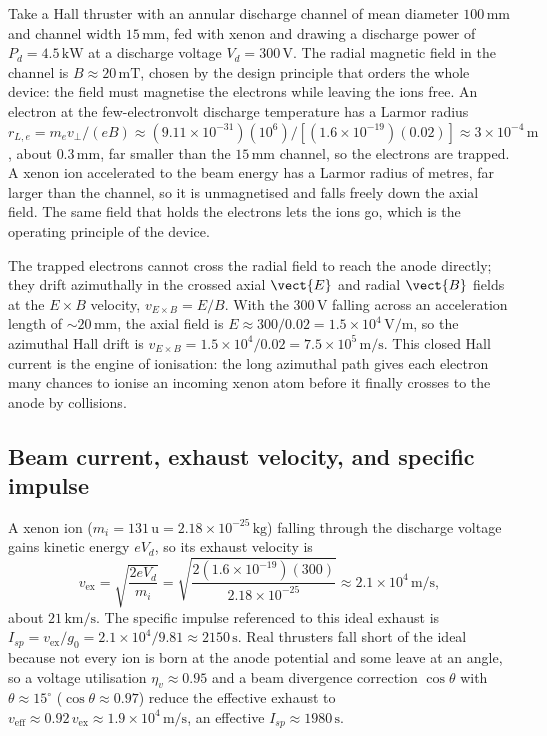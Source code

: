 Take a Hall thruster with an annular discharge channel of mean diameter
$100\,\si{\milli\meter}$ and channel width $15\,\si{\milli\meter}$, fed with
xenon and drawing a discharge power of $P_{d} = 4.5\,\si{\kilo\watt}$ at a
discharge voltage $V_{d} = 300\,\si{\volt}$. The radial magnetic field in
the channel is $B \approx 20\,\si{\milli\tesla}$, chosen by the design
principle that orders the whole device: the field must magnetise the
electrons while leaving the ions free. An electron at the few-electronvolt
discharge temperature has a Larmor radius $r_{L,e} = m_{e}v_{\perp}/(eB)
\approx (9.11\times 10^{-31})(10^{6})/[(1.6\times 10^{-19})(0.02)] \approx
3\times 10^{-4}\,\si{\meter}$, about $0.3\,\si{\milli\meter}$, far smaller
than the $15\,\si{\milli\meter}$ channel, so the electrons are trapped. A
xenon ion accelerated to the beam energy has a Larmor radius of metres, far
larger than the channel, so it is unmagnetised and falls freely down the
axial field. The same field that holds the electrons lets the ions go, which
is the operating principle of the device.

The trapped electrons cannot cross the radial field to reach the anode
directly; they drift azimuthally in the crossed axial $\vect{E}$ and radial
$\vect{B}$ fields at the $E\times B$ velocity, $v_{E\times B} = E/B$. With
the $300\,\si{\volt}$ falling across an acceleration length of $\sim 20\,\si{
\milli\meter}$, the axial field is $E \approx 300/0.02 = 1.5\times
10^{4}\,\si{\volt\per\meter}$, so the azimuthal Hall drift is $v_{E\times B}
= 1.5\times 10^{4}/0.02 = 7.5\times 10^{5}\,\si{\meter\per\second}$. This
closed Hall current is the engine of ionisation: the long azimuthal path
gives each electron many chances to ionise an incoming xenon atom before it
finally crosses to the anode by collisions.

\subsection{Beam current, exhaust velocity, and specific impulse}

A xenon ion ($m_{i} = 131\,\text{u} = 2.18\times 10^{-25}\,\si{\kilogram}$)
falling through the discharge voltage gains kinetic energy $eV_{d}$, so its
exhaust velocity is
\[
v_{\mathrm{ex}} = \sqrt{\frac{2eV_{d}}{m_{i}}}
= \sqrt{\frac{2(1.6\times 10^{-19})(300)}{2.18\times 10^{-25}}}
\approx 2.1\times 10^{4}\,\si{\meter\per\second},
\]
about $21\,\si{\kilo\meter\per\second}$. The specific impulse referenced to
this ideal exhaust is $I_{sp} = v_{\mathrm{ex}}/g_{0} = 2.1\times 10^{4}/9.81
\approx 2150\,\si{\second}$. Real thrusters fall short of the ideal because
not every ion is born at the anode potential and some leave at an angle, so
a voltage utilisation $\eta_{v}\approx 0.95$ and a beam divergence
correction $\cos\theta$ with $\theta\approx 15^{\circ}$ ($\cos\theta\approx
0.97$) reduce the effective exhaust to $v_{\mathrm{eff}}\approx 0.92\,
v_{\mathrm{ex}}\approx 1.9\times 10^{4}\,\si{\meter\per\second}$, an
effective $I_{sp}\approx 1980\,\si{\second}$.

